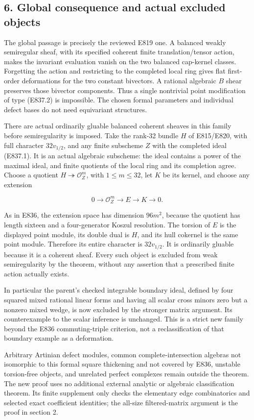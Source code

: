 \subsection{6. Global consequence and actual excluded
objects}\label{SF-E837:global-consequence-and-actual-excluded-objects}

The global passage is precisely the reviewed E819 one. A balanced weakly
semiregular sheaf, with its specified coherent finite translation/tensor
action, makes the invariant evaluation vanish on the two balanced
cap-kernel classes. Forgetting the action and restricting to the
completed local ring gives flat first-order deformations for the two
constant bivectors. A rational algebraic \(B\) shear preserves those
bivector components. Thus a single nontrivial point modification of type
(E837.2) is impossible. The chosen formal parameters and individual
defect bases do not need equivariant structures.

There are actual ordinarily gluable balanced coherent sheaves in this
family before semiregularity is imposed. Take the rank-32 bundle \(H\)
of E815/E820, with full character \(32v_{1/2}\), and any finite
subscheme \(Z\) with the completed ideal (E837.1). It is an actual
algebraic subscheme: the ideal contains a power of the maximal ideal,
and finite quotients of the local ring and its completion agree. Choose
a quotient \(H\twoheadrightarrow\mathcal O_Z^m\), with \(1\le m\le32\),
let \(K\) be its kernel, and choose any extension

\[
 0\longrightarrow\mathcal O_Z^m\longrightarrow E\longrightarrow K
       \longrightarrow0.
 \tag{E837.17}
\]

As in E836, the extension space has dimension \(96m^2\), because the
quotient has length sixteen and a four-generator Koszul resolution. The
torsion of \(E\) is the displayed point module, its double dual is
\(H\), and its hull cokernel is the same point module. Therefore its
entire character is \(32v_{1/2}\). It is ordinarily gluable because it
is a coherent sheaf. Every such object is excluded from weak
semiregularity by the theorem, without any assertion that a prescribed
finite action actually exists.

In particular the parent's checked integrable boundary ideal, defined by
four squared mixed rational linear forms and having all scalar cross
minors zero but a nonzero mixed wedge, is now excluded by the stronger
matrix argument. Its counterexample to the scalar inference is
unchanged. This is a strict new family beyond the E836 commuting-triple
criterion, not a reclassification of that boundary example as a
deformation.

Arbitrary Artinian defect modules, common complete-intersection algebras
not isomorphic to this formal square thickening and not covered by E836,
unstable torsion-free objects, and unrelated perfect complexes remain
outside the theorem. The new proof uses no additional external analytic
or algebraic classification theorem. Its finite supplement only checks
the elementary edge combinatorics and selected exact coefficient
identities; the all-size filtered-matrix argument is the proof in
section 2.
